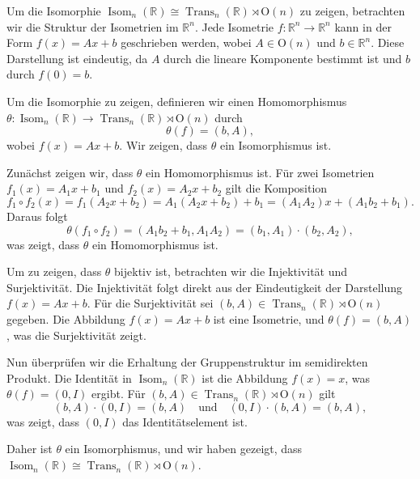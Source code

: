 Um die Isomorphie $\operatorname{Isom}_n(\mathbb{R}) \cong \operatorname{Trans}_n(\mathbb{R}) \rtimes \mathrm{O}(n)$ zu zeigen, betrachten wir die Struktur der Isometrien im $\mathbb{R}^n$. Jede Isometrie $f: \mathbb{R}^n \to \mathbb{R}^n$ kann in der Form $f(x) = Ax + b$ geschrieben werden, wobei $A \in \mathrm{O}(n)$ und $b \in \mathbb{R}^n$. Diese Darstellung ist eindeutig, da $A$ durch die lineare Komponente bestimmt ist und $b$ durch $f(0) = b$.

Um die Isomorphie zu zeigen, definieren wir einen Homomorphismus $\theta: \operatorname{Isom}_n(\mathbb{R}) \to \operatorname{Trans}_n(\mathbb{R}) \rtimes \mathrm{O}(n)$ durch
\[
\theta(f) = (b, A),
\]
wobei $f(x) = Ax + b$. Wir zeigen, dass $\theta$ ein Isomorphismus ist.

Zunächst zeigen wir, dass $\theta$ ein Homomorphismus ist. Für zwei Isometrien $f_1(x) = A_1 x + b_1$ und $f_2(x) = A_2 x + b_2$ gilt die Komposition
\[
f_1 \circ f_2(x) = f_1(A_2 x + b_2) = A_1(A_2 x + b_2) + b_1 = (A_1 A_2)x + (A_1 b_2 + b_1).
\]
Daraus folgt
\[
\theta(f_1 \circ f_2) = (A_1 b_2 + b_1, A_1 A_2) = (b_1, A_1) \cdot (b_2, A_2),
\]
was zeigt, dass $\theta$ ein Homomorphismus ist.

Um zu zeigen, dass $\theta$ bijektiv ist, betrachten wir die Injektivität und Surjektivität. Die Injektivität folgt direkt aus der Eindeutigkeit der Darstellung $f(x) = Ax + b$. Für die Surjektivität sei $(b, A) \in \operatorname{Trans}_n(\mathbb{R}) \rtimes \mathrm{O}(n)$ gegeben. Die Abbildung $f(x) = Ax + b$ ist eine Isometrie, und $\theta(f) = (b, A)$, was die Surjektivität zeigt.

Nun überprüfen wir die Erhaltung der Gruppenstruktur im semidirekten Produkt. Die Identität in $\operatorname{Isom}_n(\mathbb{R})$ ist die Abbildung $f(x) = x$, was $\theta(f) = (0, I)$ ergibt. Für $(b, A) \in \operatorname{Trans}_n(\mathbb{R}) \rtimes \mathrm{O}(n)$ gilt
\[
(b, A) \cdot (0, I) = (b, A) \quad \text{und} \quad (0, I) \cdot (b, A) = (b, A),
\]
was zeigt, dass $(0, I)$ das Identitätselement ist.

Daher ist $\theta$ ein Isomorphismus, und wir haben gezeigt, dass $\operatorname{Isom}_n(\mathbb{R}) \cong \operatorname{Trans}_n(\mathbb{R}) \rtimes \mathrm{O}(n)$.

